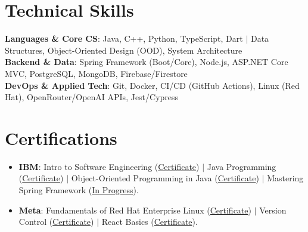 \documentclass[letterpaper,11pt]{article}
\newcommand{\resumeItem}[1]{\item\small{#1}\vspace{-2pt}}
\newcommand{\resumeSubHeadingListStart}[1][]{%
\begin{itemize}[leftmargin=0.15in, label={}, #1]%
}
\newcommand{\resumeSubHeadingListEnd}{\end{itemize}}
\newcommand{\techAfter}{-4pt}
\newcommand{\certBefore}{-20pt}
\newcommand{\certAfter}{-5pt}
\begin{document}
\section{Technical Skills}
\vspace{\techAfter}
\begin{itemize}[leftmargin=0.15in, label={}]
\small{\item{
\textbf{Languages \& Core CS}{: Java, C++, Python, TypeScript, Dart $|$ Data Structures, Object-Oriented Design (OOD), System Architecture} \\
\textbf{Backend \& Data}{: Spring Framework (Boot/Core), Node.js, ASP.NET Core MVC, PostgreSQL, MongoDB, Firebase/Firestore} \\
\textbf{DevOps \& Applied Tech}{: Git, Docker, CI/CD (GitHub Actions), Linux (Red Hat), OpenRouter/OpenAI APIs, Jest/Cypress}
}}
\end{itemize}

\vspace{\certBefore}
\section{Certifications}
\vspace{\certAfter}


\resumeSubHeadingListStart
\resumeItem{\textbf{IBM}: Intro to Software Engineering (\href{https://www.coursera.org/account/accomplishments/verify/3YT6CCM23JZP?utm_source=ios&utm_medium=certificate&utm_content=cert_image&utm_campaign=sharing_cta&utm_product=course$0}{Certificate}) $|$ Java Programming (\href{https://www.coursera.org/account/accomplishments/verify/HVHDT9VL8ND8?utm_source=ios&utm_medium=certificate&utm_content=cert_image&utm_campaign=sharing_cta&utm_product=course$0}{Certificate}) $|$ Object-Oriented Programming in Java (\href{https://www.coursera.org/account/accomplishments/verify/Z2WBGOS9NPWS?utm_source=ios&utm_medium=certificate&utm_content=cert_image&utm_campaign=sharing_cta&utm_product=course$0}{Certificate}) $|$ Mastering Spring Framework (\href{}{In Progress}).}
\resumeItem{\textbf{Meta}: Fundamentals of Red Hat Enterprise Linux (\href{https://www.coursera.org/account/accomplishments/verify/ZR3UJ45PMPB5?utm_source=ios&utm_medium=certificate&utm_content=cert_image&utm_campaign=sharing_cta&utm_product=course$0}{Certificate}) $|$ Version Control (\href{https://www.coursera.org/account/accomplishments/verify/MQPHERFUSWLG?utm_source=ios&utm_medium=certificate&utm_content=cert_image&utm_campaign=sharing_cta&utm_product=course$0}{Certificate}) $|$ React Basics (\href{https://www.coursera.org/account/accomplishments/verify/BVO3NU7GM7VQ?utm_source=ios&utm_medium=certificate&utm_content=cert_image&utm_campaign=sharing_cta&utm_product=course$0}{Certificate}).}
\resumeSubHeadingListEnd
\end{document}
